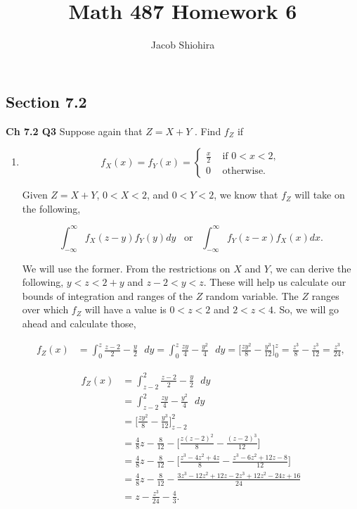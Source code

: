 \documentclass[12pt]{article}
\begin{document}
\title{Math 487 Homework 6}
\author{Jacob Shiohira}
\maketitle

\subsection*{Section 7.2}
\noindent
\textbf{Ch 7.2 Q3} Suppose again that $Z = X + Y$ . Find $f_Z$ if

\begin{enumerate}[label=(\alph*)]
\item 

\[ f_X(x) = f_Y(x) = \begin{cases} 
      \frac{x}{2} & \text{ if } 0 < x < 2, \\
      0 & \text{ otherwise}.
      \end{cases} \]

\noindent
Given $Z = X + Y$, $0 < X < 2$, and $0 < Y < 2$, we know that $f_Z$ will take on the following,

\begin{equation*}
\int_{- \infty}^{\infty} f_X(z-y) f_Y(y) dy \enspace \text{ or } \enspace \int_{- \infty}^{\infty} f_Y(z-x) f_X(x) dx.
\end{equation*}

\noindent
We will use the former. From the restrictions on $X$ and $Y$, we can derive the following, $y < z < 2+y$ and $z-2 < y < z$. These will help us calculate our bounds of integration and ranges of the $Z$ random variable. The $Z$ ranges over which $f_Z$ will have a value is $0 < z < 2$ and $2 < z < 4$. So, we will go ahead and calculate those,

\begin{align*}
f_Z(x) &= \int_{0}^{z} \frac{z-2}{2} - \frac{y}{2} \text{ } dy = \int_{0}^{z} \frac{zy}{4} - \frac{y^2}{4} \text{ } dy = \Bigg [ \frac{zy^2}{8} - \frac{y^3}{12} \Bigg ]_{0}^{z} = \frac{z^3}{8} - \frac{z^3}{12} = \frac{z^3}{24},
\end{align*}

\begin{align*}
f_Z(x) &= \int_{z-2}^{2} \frac{z-2}{2} - \frac{y}{2} \text{ } dy \\
&= \int_{z-2}^{2} \frac{zy}{4} - \frac{y^2}{4} \text{ } dy \\
&= \Bigg [ \frac{zy^2}{8} - \frac{y^3}{12} \Bigg ]_{z-2}^{2} \\
&= \frac{4}{8}z - \frac{8}{12} - \Big [ \frac{z(z-2)^2}{8} - \frac{(z-2)^3}{12} \Big ] \\
&= \frac{4}{8}z - \frac{8}{12} - \Big [ \frac{z^3 - 4z^2 + 4z}{8} - \frac{z^3-6z^2+12z-8}{12} \Big ] \\
&= \frac{4}{8}z - \frac{8}{12} - \frac{3z^3 - 12z^2 + 12z - 2z^3 +12z^2 - 24z + 16}{24} \\
&= z - \frac{z^3}{24} - \frac{4}{3}.
\end{align*}


\end{enumerate}
\end{document}
